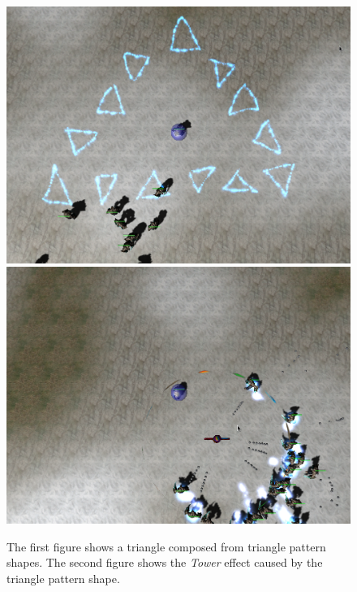 \begin{figure}[p]
\centering
\includegraphics[width=.9\linewidth]{ext/scr/pattriangle.png}
\quad
\includegraphics[width=.9\linewidth]{ext/scr/pattrianglee.png}
\caption{The first figure shows a triangle composed from triangle pattern shapes. The second figure shows the \emph{Tower} effect caused by the triangle pattern shape. }
\label{fig:spell:pattriangle}
\end{figure}

